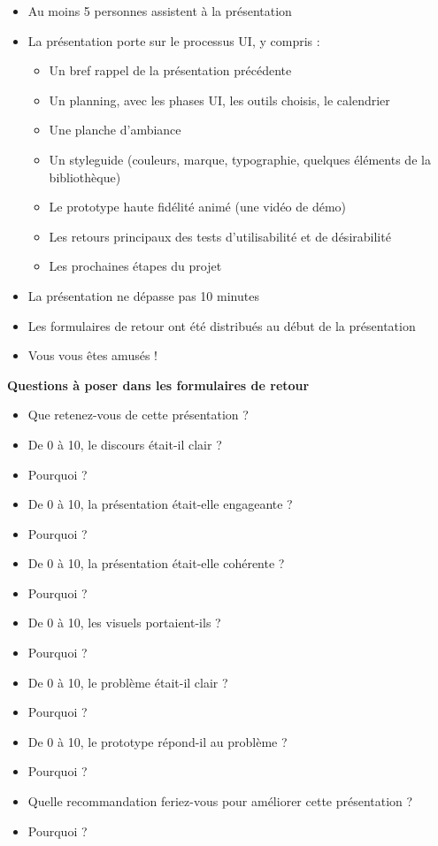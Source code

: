 \begin{itemize}
\item Au moins 5 personnes assistent à la présentation
\item La présentation porte sur le processus UI, y compris :
\begin{itemize}
\item Un bref rappel de la présentation précédente
\item Un planning, avec les phases UI, les outils choisis, le calendrier
\item Une planche d'ambiance
\item Un styleguide (couleurs, marque, typographie, quelques éléments de la bibliothèque)
\item Le prototype haute fidélité animé (une vidéo de démo)
\item Les retours principaux des tests d'utilisabilité et de désirabilité
\item Les prochaines étapes du projet
\end{itemize}
\item La présentation ne dépasse pas 10 minutes
\item Les formulaires de retour ont été distribués au début de la présentation
\item Vous vous êtes amusés !
\end{itemize}

\textbf{Questions à poser dans les formulaires de retour}

\begin{itemize}
\item Que retenez-vous de cette présentation ?
\item De 0 à 10, le discours était-il clair ?
\item Pourquoi ?
\item De 0 à 10, la présentation était-elle engageante ?
\item Pourquoi ?
\item De 0 à 10, la présentation était-elle cohérente ?
\item Pourquoi ?
\item De 0 à 10, les visuels portaient-ils ?
\item Pourquoi ?
\item De 0 à 10, le problème était-il clair ?
\item Pourquoi ?
\item De 0 à 10, le prototype répond-il au problème ?
\item Pourquoi ?
\item Quelle recommandation feriez-vous pour améliorer cette présentation ?
\item Pourquoi ?
\end{itemize}

